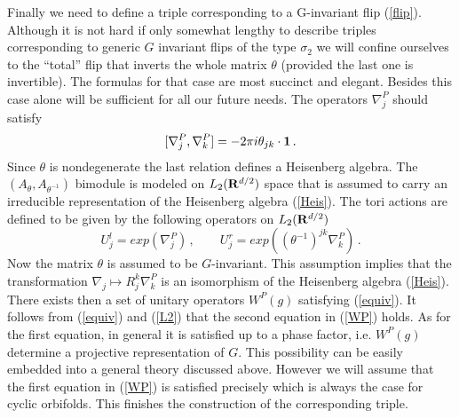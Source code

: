 \documentclass[a4paper,a4paper]{article}
\begin{document}
{Finally we need to define a triple corresponding to a G-invariant flip (\ref{flip}). Although it is not hard 
if only somewhat lengthy to describe triples corresponding to generic $G$ invariant flips of the type $\sigma_{2}$ 
we will confine ourselves to the ``total'' flip that inverts the whole matrix $\theta$ (provided the last one is 
invertible). The formulas for that case are most succinct and elegant. Besides this case alone will be 
sufficient for all our future needs.  
The operators $\nabla^{P}_{j}$ should   satisfy 
\begin{equation}\label{Heis}
[\nabla^{P}_{j}, \nabla_{k}^{P}] = -2\pi i \theta_{jk} \cdot {\bf 1}\, .
\end{equation}
Since $\theta$ is nondegenerate the last relation defines a Heisenberg algebra. 
The $(A_{\theta}, A_{\theta^{-1}})$ bimodule is modeled on $L_{2}({\bf R}^{d/2})$ space that is  
assumed to carry an irreducible representation of the Heisenberg algebra (\ref{Heis}). 
The tori actions are defined to be given by the following operators on   $L_{2}({\bf R}^{d/2})$
\begin{equation} \label{L2}
U^{l}_{j} = exp(\nabla^{P}_{j}) \, , \qquad U^{r}_{j} = exp((\theta^{-1})^{jk}\nabla^{P}_{k}) \, .  
\end{equation}
Now the matrix $\theta$ is assumed to be $G$-invariant. This assumption implies that 
 the  transformation $\nabla_{j}\mapsto R_{j}^{k}\nabla^{P}_{k}$ 
is an isomorphism of the Heisenberg algebra (\ref{Heis}). There exists then a set of unitary operators 
$W^{P}(g)$ satisfying (\ref{equiv}). It follows from (\ref{equiv}) and (\ref{L2}) that  the second equation in (\ref{WP})
holds. As for the first equation, in general it is 
satisfied up to a phase factor, i.e. $W^{P}(g)$ determine a projective representation of $G$. 
This possibility can be easily embedded into a general theory discussed above. However we will 
assume that the first equation in (\ref{WP}) is satisfied precisely which is always the case for 
cyclic orbifolds. This finishes the construction of the corresponding triple.


}
\end{document}
